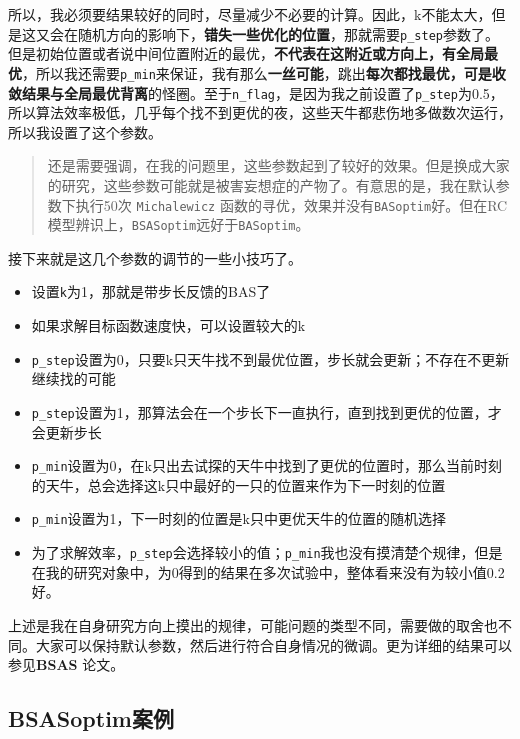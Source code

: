 \documentclass[]{ctexbook}
\providecommand{\tightlist}{%
  \setlength{\itemsep}{0pt}\setlength{\parskip}{0pt}}
\theoremstyle{definition}
\theoremstyle{definition}
\theoremstyle{definition}
\theoremstyle{remark}
\begin{document}
所以，我必须要结果较好的同时，尽量减少不必要的计算。因此，k不能太大，但是这又会在随机方向的影响下，\textbf{错失一些优化的位置}，那就需要\texttt{p\_step}参数了。但是初始位置或者说中间位置附近的最优，\textbf{不代表在这附近或方向上，有全局最优}，所以我还需要\texttt{p\_min}来保证，我有那么\textbf{一丝可能}，跳出\textbf{每次都找最优，可是收敛结果与全局最优背离}的怪圈。至于\texttt{n\_flag}，是因为我之前设置了\texttt{p\_step}为0.5，所以算法效率极低，几乎每个找不到更优的夜，这些天牛都悲伤地多做数次运行，所以我设置了这个参数。

\begin{quote}
还是需要强调，在我的问题里，这些参数起到了较好的效果。但是换成大家的研究，这些参数可能就是被害妄想症的产物了。有意思的是，我在默认参数下执行50次
\texttt{Michalewicz}
函数的寻优，效果并没有\texttt{BASoptim}好。但在RC模型辨识上，\texttt{BSASoptim}远好于\texttt{BASoptim}。
\end{quote}

接下来就是这几个参数的调节的一些小技巧了。

\begin{itemize}
\tightlist
\item
  设置\texttt{k}为1，那就是带步长反馈的BAS了
\item
  如果求解目标函数速度快，可以设置较大的k
\item
  \texttt{p\_step}设置为0，只要k只天牛找不到最优位置，步长就会更新；不存在不更新继续找的可能
\item
  \texttt{p\_step}设置为1，那算法会在一个步长下一直执行，直到找到更优的位置，才会更新步长
\item
  \texttt{p\_min}设置为0，在k只出去试探的天牛中找到了更优的位置时，那么当前时刻的天牛，总会选择这k只中最好的一只的位置来作为下一时刻的位置
\item
  \texttt{p\_min}设置为1，下一时刻的位置是k只中更优天牛的位置的随机选择
\item
  为了求解效率，\texttt{p\_step}会选择较小的值；\texttt{p\_min}我也没有摸清楚个规律，但是在我的研究对象中，为0得到的结果在多次试验中，整体看来没有为较小值0.2好。
\end{itemize}

上述是我在自身研究方向上摸出的规律，可能问题的类型不同，需要做的取舍也不同。大家可以保持默认参数，然后进行符合自身情况的微调。更为详细的结果可以参见\textbf{BSAS}
\citep{Wang2018BSAS}论文。

\subsection{BSASoptim案例}\label{BSASexample}
\end{document}
